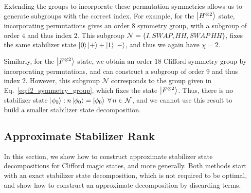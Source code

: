 Extending the groups to incorporate these permutation symmetries allows us to generate subgroups with the correct index. For example, for the $\ket{H^{\otimes 2}}$ state, incorporating permutations gives an order $8$ symmetry group, with a subgroup of order $4$ and thus index $2$. This subgroup $\mathcal{N}=\{I, SWAP, HH, SWAP\,HH\}$, fixes the same stabilizer state $\ket{0}\ket{+}+\ket{1}\ket{-}$, and thus we again have $\chi=2$.\par
Similarly, for the $\ket{F^{\otimes 2}}$ state, we obtain an order $18$ Clifford symmetry group by incorporating permutations, and can construct a subgroup of order $9$ and thus index $2$. However, this subgroup $\mathcal{N}$ corresponds to the group given in Eq.~\ref{eq:f2_symmetry_group}, which fixes the state $\ket{F^{\otimes 2}}$. Thus, there is no stabilizer state $\ket{\phi_{0}}:n\ket{\phi_{0}}=\ket{\phi_{0}}\;\forall\,n\in\mathcal{N}$, and we cannot use this result to build a smaller stabilizer state decomposition.
\subsection{Approximate Stabilizer Rank}\label{sec:approx_results}
In this section, we show how to construct approximate stabilizer state decompositions for Clifford magic states, and more generally. Both methods start with an exact stabilizer state decomposition, which is not required to be optimal, and show how to construct an approximate decomposition by discarding terms.
